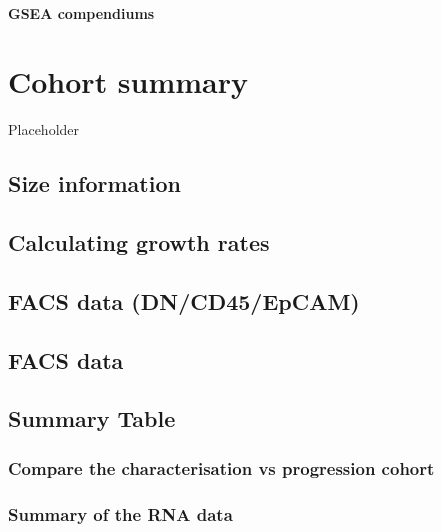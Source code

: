 \documentclass[
]{book}
\begin{document}
\hypertarget{gsea-compendiums}{%
\subsubsection{GSEA compendiums}\label{gsea-compendiums}}

\hypertarget{cohort-summary}{%
\chapter{Cohort summary}\label{cohort-summary}}

Placeholder

\hypertarget{size-information}{%
\section{Size information}\label{size-information}}

\hypertarget{calculating-growth-rates}{%
\section{Calculating growth rates}\label{calculating-growth-rates}}

\hypertarget{facs-data-dncd45epcam}{%
\section{FACS data (DN/CD45/EpCAM)}\label{facs-data-dncd45epcam}}

\hypertarget{facs-data}{%
\section{FACS data}\label{facs-data}}

\hypertarget{summary-table}{%
\section{Summary Table}\label{summary-table}}

\hypertarget{compare-the-characterisation-vs-progression-cohort}{%
\subsection{Compare the characterisation vs progression cohort}\label{compare-the-characterisation-vs-progression-cohort}}

\hypertarget{summary-of-the-rna-data}{%
\subsection{Summary of the RNA data}\label{summary-of-the-rna-data}}
\end{document}

